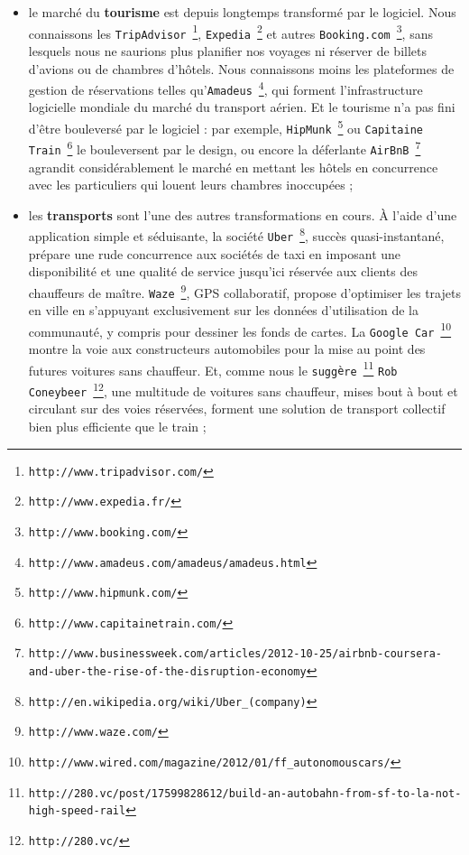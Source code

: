 \documentclass[11pt,twoside,a4paper]{article}
\begin{document}
\setlength\parindent{15pt}
\begin{itemize}
	\item le march{\'e} du \textbf{tourisme} est depuis longtemps transform{\'e} par le logiciel. Nous connaissons les \texttt{TripAdvisor}~\footnote{\texttt{http://www.tripadvisor.com/}}, \texttt{Expedia}~\footnote{\texttt{http://www.expedia.fr/}} et autres \texttt{Booking.com}~\footnote{\texttt{http://www.booking.com/}}, sans lesquels nous ne saurions plus planifier nos voyages ni r{\'e}server de billets d'avions ou de chambres d'h{\^o}tels. Nous connaissons moins les plateformes de gestion de r{\'e}servations telles qu'\texttt{Amadeus}~\footnote{\texttt{http://www.amadeus.com/amadeus/amadeus.html}}, qui forment l'infrastructure logicielle mondiale du march{\'e} du transport a{\'e}rien. Et le tourisme n'a pas fini d'{\^e}tre boulevers{\'e} par le logiciel : par exemple, \texttt{HipMunk}~\footnote{\texttt{http://www.hipmunk.com/}} ou \texttt{Capitaine Train}~\footnote{\texttt{http://www.capitainetrain.com/}} le bouleversent par le design, ou encore la d{\'e}ferlante \texttt{AirBnB}~\footnote{\texttt{http://www.businessweek.com/articles/2012-10-25/airbnb-coursera-and-uber-the-rise-of-the-disruption-economy}} agrandit consid{\'e}rablement le march{\'e} en mettant les h{\^o}tels en concurrence avec les particuliers qui louent leurs chambres inoccup{\'e}es ;
	\item les \textbf{transports} sont l'une des autres transformations en cours. {\`A} l'aide d'une application simple et s{\'e}duisante, la soci{\'e}t{\'e} \texttt{Uber}~\footnote{\texttt{http://en.wikipedia.org/wiki/Uber\_(company)}}, succ{\`e}s quasi-instantan{\'e}, pr{\'e}pare une rude concurrence aux soci{\'e}t{\'e}s de taxi en imposant une disponibilit{\'e} et une qualit{\'e} de service jusqu'ici r{\'e}serv{\'e}e aux clients des chauffeurs de ma{\^i}tre. \texttt{Waze}~\footnote{\texttt{http://www.waze.com/}}, GPS collaboratif, propose d'optimiser les trajets en ville en s'appuyant exclusivement sur les donn{\'e}es d'utilisation de la communaut{\'e}, y compris pour dessiner les fonds de cartes. La \texttt{Google Car}~\footnote{\texttt{http://www.wired.com/magazine/2012/01/ff\_autonomouscars/}} montre la voie aux constructeurs automobiles pour la mise au point des futures voitures sans chauffeur. Et, comme nous le \texttt{sugg{\`e}re}~\footnote{\texttt{http://280.vc/post/17599828612/build-an-autobahn-from-sf-to-la-not-high-speed-rail}} \texttt{Rob Coneybeer}~\footnote{\texttt{http://280.vc/}}, une multitude de voitures sans chauffeur, mises bout {\`a} bout et circulant sur des voies r{\'e}serv{\'e}es, forment une solution de transport collectif bien plus efficiente que le train ;

\end{itemize}
\end{document}
